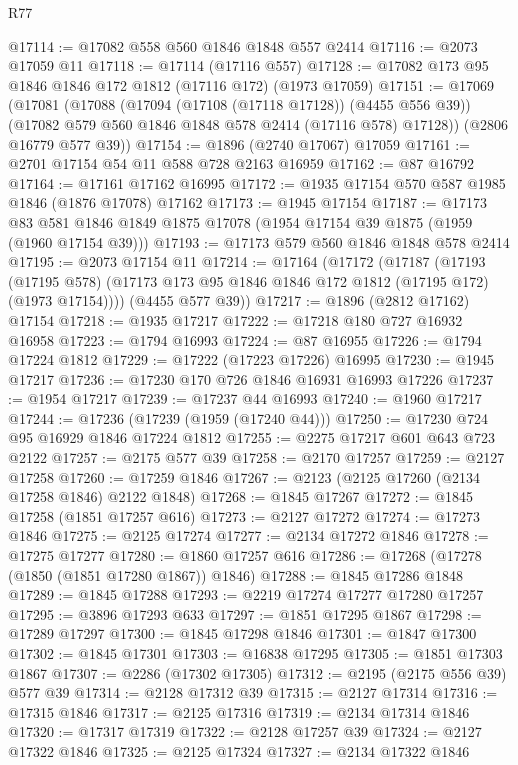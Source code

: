 \begin{lexlean}{R77}
\begin{coremodule}
@17114 := @17082 @558 @560 @1846 @1848 @557 @2414
@17116 := @2073 @17059 @11
@17118 := @17114 (@17116 @557)
@17128 := @17082 @173 @95 @1846 @1846 @172 @1812 (@17116 @172) (@1973 @17059)
@17151 := @17069
    (@17081
      (@17088
        (@17094 (@17108 (@17118 @17128)) (@4455 @556 @39))
        (@17082 @579 @560 @1846 @1848 @578 @2414 (@17116 @578) @17128))
      (@2806 @16779 @577 @39))
@17154 := @1896 (@2740 @17067) @17059
@17161 := @2701 @17154 @54 @11 @588 @728 @2163 @16959
@17162 := @87 @16792
@17164 := @17161 @17162 @16995
@17172 := @1935 @17154 @570 @587 @1985 @1846 (@1876 @17078) @17162
@17173 := @1945 @17154
@17187 := @17173
    @83
    @581
    @1846
    @1849
    @1875
    @17078
    (@1954 @17154 @39 @1875 (@1959 (@1960 @17154 @39)))
@17193 := @17173 @579 @560 @1846 @1848 @578 @2414
@17195 := @2073 @17154 @11
@17214 := @17164
    (@17172
      (@17187
        (@17193
          (@17195 @578)
          (@17173 @173 @95 @1846 @1846 @172 @1812 (@17195 @172) (@1973 @17154))))
      (@4455 @577 @39))
@17217 := @1896 (@2812 @17162) @17154
@17218 := @1935 @17217
@17222 := @17218 @180 @727 @16932 @16958
@17223 := @1794 @16993
@17224 := @87 @16955
@17226 := @1794 @17224 @1812
@17229 := @17222 (@17223 @17226) @16995
@17230 := @1945 @17217
@17236 := @17230 @170 @726 @1846 @16931 @16993 @17226
@17237 := @1954 @17217
@17239 := @17237 @44 @16993
@17240 := @1960 @17217
@17244 := @17236 (@17239 (@1959 (@17240 @44)))
@17250 := @17230 @724 @95 @16929 @1846 @17224 @1812
@17255 := @2275 @17217 @601 @643 @723 @2122
@17257 := @2175 @577 @39
@17258 := @2170 @17257
@17259 := @2127 @17258
@17260 := @17259 @1846
@17267 := @2123 (@2125 @17260 (@2134 @17258 @1846) @2122 @1848)
@17268 := @1845 @17267
@17272 := @1845 @17258 (@1851 @17257 @616)
@17273 := @2127 @17272
@17274 := @17273 @1846
@17275 := @2125 @17274
@17277 := @2134 @17272 @1846
@17278 := @17275 @17277
@17280 := @1860 @17257 @616
@17286 := @17268 (@17278 (@1850 (@1851 @17280 @1867)) @1846)
@17288 := @1845 @17286 @1848
@17289 := @1845 @17288
@17293 := @2219 @17274 @17277 @17280 @17257
@17295 := @3896 @17293 @633
@17297 := @1851 @17295 @1867
@17298 := @17289 @17297
@17300 := @1845 @17298 @1846
@17301 := @1847 @17300
@17302 := @1845 @17301
@17303 := @16838 @17295
@17305 := @1851 @17303 @1867
@17307 := @2286 (@17302 @17305)
@17312 := @2195 (@2175 @556 @39) @577 @39
@17314 := @2128 @17312 @39
@17315 := @2127 @17314
@17316 := @17315 @1846
@17317 := @2125 @17316
@17319 := @2134 @17314 @1846
@17320 := @17317 @17319
@17322 := @2128 @17257 @39
@17324 := @2127 @17322 @1846
@17325 := @2125 @17324
@17327 := @2134 @17322 @1846

\end{coremodule}
\end{lexlean}

